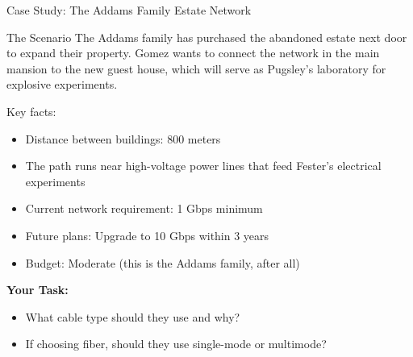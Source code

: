 \documentclass[aspectratio=169]{beamer}
\begin{document}
\begin{frame}{Case Study: The Addams Family Estate Network}
    \begin{block}{The Scenario}
        \scriptsize
        The Addams family has purchased the abandoned estate next door to expand their property. Gomez wants to connect the network in the main mansion to the new guest house, which will serve as Pugsley's laboratory for explosive experiments.
        
        \vspace{0.3cm}
        Key facts:
        \begin{itemize}
            \item Distance between buildings: 800 meters
            \item The path runs near high-voltage power lines that feed Fester's electrical experiments
            \item Current network requirement: 1 Gbps minimum
            \item Future plans: Upgrade to 10 Gbps within 3 years
            \item Budget: Moderate (this is the Addams family, after all)
        \end{itemize}
    \end{block}
    
    \vspace{0.3cm}
    \textbf{Your Task:}
    \begin{itemize}
        \item What cable type should they use and why?
        \item If choosing fiber, should they use single-mode or multimode?
    \end{itemize}
\end{frame}
\end{document}
